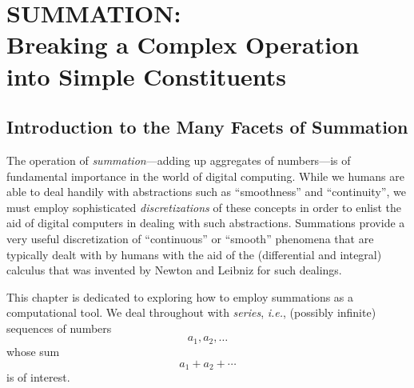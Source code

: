 
\chapter{SUMMATION: \\
Breaking a Complex Operation into Simple Constituents}
\label{ch:Summation}


\section{Introduction to the Many Facets of Summation}
\label{sec:intro}

The operation of {\it summation}---adding up aggregates of
numbers---is of fundamental importance in the world of digital
computing.  While we humans are able to deal handily with abstractions
such as ``smoothness'' and ``continuity'', we must employ
sophisticated {\em discretizations} of these concepts in order to
enlist the aid of digital computers in dealing with such abstractions.
Summations provide a very useful discretization of ``continuous'' or
``smooth'' phenomena that are typically dealt with by humans with the
aid of the (differential and integral) calculus that was invented by
Newton and Leibniz for such dealings.

This chapter is dedicated to exploring how to employ summations as a
computational tool.  We deal throughout with {\it series}, {\it i.e.},
(possibly infinite) sequences of numbers
\[ a_1, a_2, \ldots \]
whose sum
\begin{equation}
\label{eq:abstract-sum}
a_1 + a_2 + \cdots
\end{equation}
is of interest.
\medskip

\noindent {}

